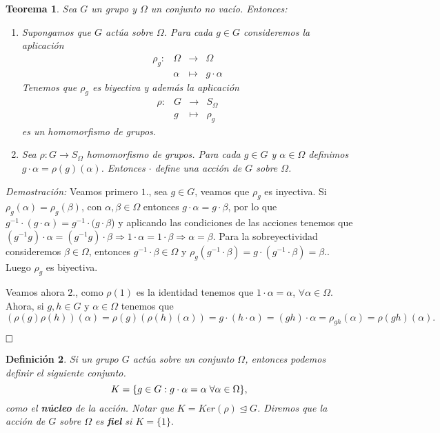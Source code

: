 \documentclass[12pt]{article}
\newtheorem{theorem}{Teorema}[section]
\newtheorem{definition}[theorem]{Definición}
\begin{document}
\begin{theorem} \label{eq:princAcci}
Sea $G$ un grupo y $\Omega$ un conjunto no vacío. Entonces: 
\begin{enumerate}
\item Supongamos que $G$ actúa sobre $\Omega$. Para cada $g \in G$ consideremos la aplicación $$\begin{array}{rccl}
\rho_g \colon &\Omega&\longrightarrow &\Omega \\
&\alpha& \longmapsto &g \cdot \alpha
\end{array}
$$
Tenemos que $\rho_g$ es biyectiva y además la aplicación 
$$\begin{array}{rccl}
\rho \colon &G&\longrightarrow &S_{\Omega} \\
&g& \longmapsto &\rho_g
\end{array}
$$ es un homomorfismo de grupos.
\item Sea $\rho \colon G \longrightarrow S_{\Omega}$ homomorfismo de grupos. Para cada $g \in G$ y $\alpha \in \Omega$ definimos $g \cdot \alpha = \rho(g)(\alpha)$. Entonces $\cdot$ define una acción de $G$ sobre $\Omega$.
\end{enumerate}
\end{theorem}
\emph{Demostración: }Veamos primero $1.$, sea $g \in G$, veamos que $\rho_g$ es inyectiva. Si $\rho_g(\alpha)=\rho_g(\beta)$, con $\alpha, \beta \in \Omega$ entonces $g \cdot \alpha = g \cdot \beta$, por lo que $g^{-1} \cdot (g\cdot \alpha) = g^{-1}  \cdot (g \cdot \beta$) y aplicando las condiciones de las acciones tenemos que $ (g^{-1}g) \cdot \alpha = (g^{-1}g) \cdot \beta \Rightarrow 1 \cdot \alpha = 1 \cdot \beta \Rightarrow \alpha = \beta$. Para la sobreyectividad consideremos $\beta \in \Omega$, entonces $ g^{-1} \cdot \beta \in \Omega$ y $\rho_g(g^{-1}\cdot \beta)= g \cdot (g^{-1} \cdot \beta )= \beta.$. Luego $\rho_g$ es biyectiva.

Veamos ahora $2.$, como $\rho (1)$ es la identidad tenemos que $1 \cdot \alpha = \alpha$, $\forall \alpha \in \Omega$. Ahora, si $g,h \in G$ y $\alpha \in \Omega$ tenemos que $$(\rho(g)\rho(h))(\alpha) = \rho(g)(\rho(h)(\alpha)) = g \cdot(h \cdot \alpha ) = (gh) \cdot \alpha = \rho_{gh}(\alpha) = \rho(gh)(\alpha).$$


$\hfill \square$

\begin{definition}Si un grupo $G$ actúa sobre un conjunto $\Omega$, entonces podemos definir el siguiente conjunto. $$K = \lbrace g \in G : g\cdot \alpha = \alpha \hspace{0.1cm} \forall \alpha \in \Omega \rbrace,$$ como el \textbf{núcleo} de la acción. Notar que $K = Ker(\rho) \unlhd G$. Diremos que la acción de $G$ sobre $\Omega$ es \textbf{fiel} si $K = \lbrace 1 \rbrace.$
\end{definition}
\end{document}
